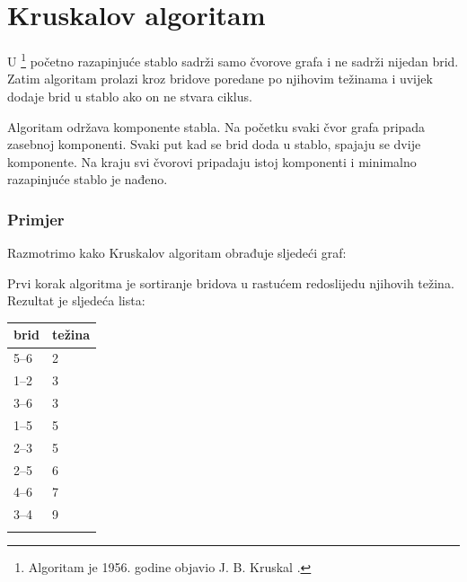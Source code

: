 \section{Kruskalov algoritam}


U \footnote{Algoritam je 1956. godine
objavio J. B. Kruskal \cite{kru56}.} početno razapinjuće stablo
sadrži samo čvorove grafa
i ne sadrži nijedan brid.
Zatim algoritam prolazi kroz bridove
poredane po njihovim težinama i uvijek dodaje brid
u stablo ako on ne stvara ciklus.

Algoritam održava komponente
stabla.
Na početku svaki čvor grafa
pripada zasebnoj komponenti.
Svaki put kad se brid doda u stablo,
spajaju se dvije komponente.
Na kraju svi čvorovi pripadaju istoj komponenti
i minimalno razapinjuće stablo je nađeno.

\subsubsection{Primjer}

\begin{samepage}
Razmotrimo kako Kruskalov algoritam obrađuje
sljedeći graf:
\begin{center}
\end{center}
\end{samepage}

\begin{samepage}
Prvi korak algoritma je sortiranje
bridova u rastućem redoslijedu njihovih težina.
Rezultat je sljedeća lista:

\begin{tabular}{ll}
\\
brid & težina \\
\hline
5--6 & 2 \\
1--2 & 3 \\
3--6 & 3 \\
1--5 & 5 \\
2--3 & 5 \\
2--5 & 6 \\
4--6 & 7 \\
3--4 & 9 \\
\\
\end{tabular}
\end{samepage}

